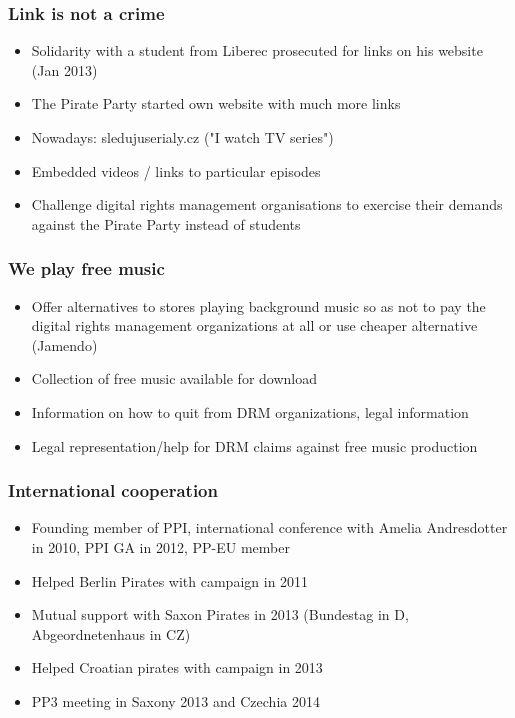 \begin{frame}
	\frametitle{Link is not a crime}
	\begin{itemize}
		\item Solidarity with a student from Liberec prosecuted for links on his website (Jan 2013)
		\item The Pirate Party started own website with much more links
		\item Nowadays: sledujuserialy.cz ("I watch TV series")
		\item Embedded videos / links to particular episodes
		\item Challenge digital rights management organisations to exercise their demands against the Pirate Party instead of students
	\end{itemize}
\end{frame}

\begin{frame}
	\frametitle{We play free music}
	\begin{itemize}
		\item Offer alternatives to stores playing background music so as not to pay the digital rights management organizations at all or use cheaper alternative (Jamendo)
		\item Collection of free music available for download
		\item Information on how to quit from DRM organizations, legal information
		\item Legal representation/help for DRM claims against free music production
	\end{itemize}
\end{frame}

\begin{frame}
	\frametitle{International cooperation}
	\begin{itemize}
		\item Founding member of PPI, international conference with Amelia Andresdotter in 2010, PPI GA in 2012, PP-EU member
		\item Helped Berlin Pirates with campaign in 2011
		\item Mutual support with Saxon Pirates in 2013 (Bundestag in D, Abgeordnetenhaus in CZ)
		\item Helped Croatian pirates with campaign in 2013
		\item PP3 meeting in Saxony 2013 and Czechia 2014
	\end{itemize}
\end{frame}
